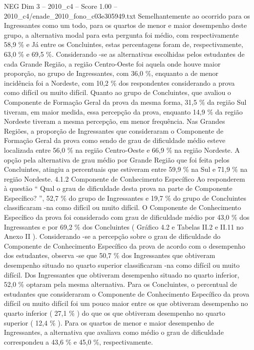 \begin{textsample}{NEG Dim 3 – 2010\_c4 – Score 1.00 – 2010\_c4/enade\_2010\_fono\_c03e305949.txt}
Semelhantemente ao ocorrido para os Ingressantes como um todo, para os quartos de menor e maior desempenho deste grupo, a alternativa modal para esta pergunta foi médio, com respectivamente 58,9 \% e Já entre os Concluintes, estas percentagens foram de, respectivamente, 63,0 \% e 69,5 \%.
Considerando -se as alternativas escolhidas pelos estudantes de cada Grande Região, a região Centro-Oeste foi aquela onde houve maior proporção, no grupo de Ingressantes, com 36,0 \%, enquanto a de menor incidência foi a Nordeste, com 10,2 \% dos respondentes considerando a prova como difícil ou muito difícil.
Quanto ao grupo de Concluintes, que avaliou o Componente de Formação Geral da prova da mesma forma, 31,5 \% da região Sul tiveram, em maior medida, essa percepção da prova, enquanto 14,9 \% da região Nordeste tiveram a mesma percepção, em menor frequência.
Nas Grandes Regiões, a proporção de Ingressantes que consideraram o Componente de Formação Geral da prova como sendo de grau de dificuldade médio esteve localizada entre 56,0 \% na região Centro-Oeste e 66,9 \% na região Nordeste.
A opção pela alternativa de grau médio por Grande Região que foi feita pelos Concluintes, atingiu a percentuais que estiveram entre 59,9 \% na Sul e 71,9 \% na região Nordeste. 4.1.2 Componente de Conhecimento Específico Ao responderem à questão “ Qual o grau de dificuldade desta prova na parte de Componente Específico? ”, 52,7 \% do grupo de Ingressantes e 19,7 \% do grupo de Concluintes classificaram -na como difícil ou muito difícil.
O Componente de Conhecimento Específico da prova foi considerado com grau de dificuldade médio por 43,0 \% dos Ingressantes e por 69,2 \% dos Concluintes ( Gráfico 4.2 e Tabelas II.2 e II.11 no Anexo II ).
Considerando -se a percepção sobre o grau de dificuldade do Componente de Conhecimento Específico da prova de acordo com o desempenho dos estudantes, observa -se que 50,7 \% dos Ingressantes que obtiveram desempenho situado no quarto superior classificaram -na como difícil ou muito difícil.
Dos Ingressantes que obtiveram desempenho situado no quarto inferior, 52,0 \% optaram pela mesma alternativa.
Para os Concluintes, o percentual de estudantes que consideraram o Componente de Conhecimento Específico da prova difícil ou muito difícil foi um pouco maior entre os que obtiveram desempenho no quarto inferior ( 27,1 \% ) do que os que obtiveram desempenho no quarto superior ( 12,4 \% ).
Para os quartos de menor e maior desempenho de Ingressantes, a alternativa que avaliava como médio o grau de dificuldade correspondeu a 43,6 \% e 45,0 \%, respectivamente.

\end{textsample}
